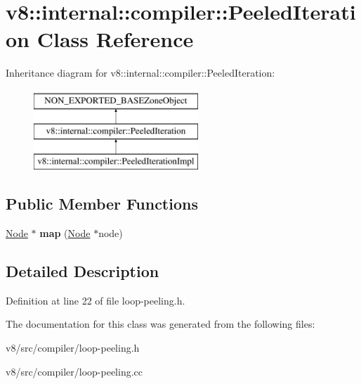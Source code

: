 \hypertarget{classv8_1_1internal_1_1compiler_1_1PeeledIteration}{}\section{v8\+:\+:internal\+:\+:compiler\+:\+:Peeled\+Iteration Class Reference}
\label{classv8_1_1internal_1_1compiler_1_1PeeledIteration}
Inheritance diagram for v8\+:\+:internal\+:\+:compiler\+:\+:Peeled\+Iteration\+:\begin{figure}[H]
\begin{center}
\leavevmode
\includegraphics[height=3.000000cm]{classv8_1_1internal_1_1compiler_1_1PeeledIteration}
\end{center}
\end{figure}
\subsection*{Public Member Functions}
\begin{DoxyCompactItemize}
\item 
\mbox{\label{classv8_1_1internal_1_1compiler_1_1PeeledIteration_a2257414d4b2c975aa831506a4ea9685c}} 
\mbox{\hyperlink{classv8_1_1internal_1_1compiler_1_1Node}{Node}} $\ast$ {\bfseries map} (\mbox{\hyperlink{classv8_1_1internal_1_1compiler_1_1Node}{Node}} $\ast$node)
\end{DoxyCompactItemize}


\subsection{Detailed Description}


Definition at line 22 of file loop-\/peeling.\+h.



The documentation for this class was generated from the following files\+:\begin{DoxyCompactItemize}
\item 
v8/src/compiler/loop-\/peeling.\+h\item 
v8/src/compiler/loop-\/peeling.\+cc\end{DoxyCompactItemize}
